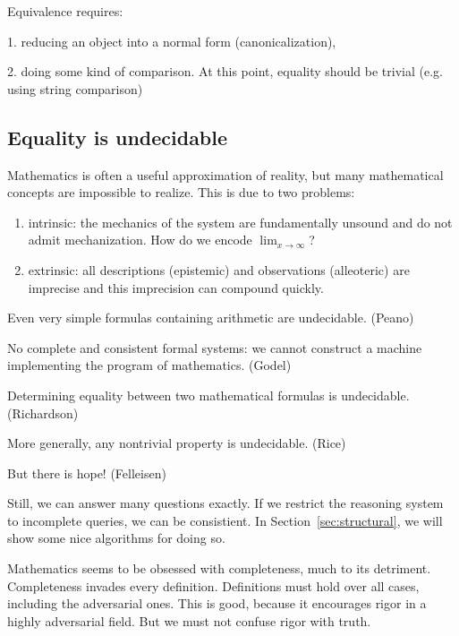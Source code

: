 \documentclass[11pt]{article}
\begin{document}
    Equivalence requires:

    1. reducing an object into a normal form (canonicalization),

    2. doing some kind of comparison. At this point, equality should be trivial (e.g. using string comparison)


    \subsection{Equality is undecidable}

    Mathematics is often a useful approximation of reality, but many mathematical concepts are impossible to realize. This is due to two problems:

    \begin{enumerate}
        \item intrinsic: the mechanics of the system are fundamentally unsound and do not admit mechanization. How do we encode $\lim_{x \rightarrow \infty}$?
        \item extrinsic: all descriptions (epistemic) and observations (alleoteric) are imprecise and this imprecision can compound quickly.
    \end{enumerate}

    Even very simple formulas containing arithmetic are undecidable. (Peano)

    No complete and consistent formal systems: we cannot construct a machine implementing the program of mathematics. (Godel)

    Determining equality between two mathematical formulas is undecidable. (Richardson)

    More generally, any nontrivial property is undecidable. (Rice)

    But there is hope! (Felleisen)


    Still, we can answer many questions exactly. If we restrict the reasoning system to incomplete queries, we can be consistient. In Section~\ref{sec:structural}, we will show some nice algorithms for doing so.

    Mathematics seems to be obsessed with completeness, much to its detriment. Completeness invades every definition. Definitions must hold over all cases, including the adversarial ones. This is good, because it encourages rigor in a highly adversarial field. But we must not confuse rigor with truth.
\end{document}
